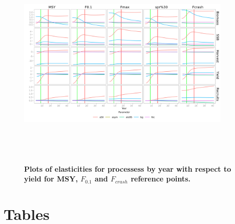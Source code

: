 \documentclass[10pt]{article}
\begin{document}
\begin{figure}[!ht]
\begin{center}
\includegraphics[height=4in, width=4in]{fig7.png}
\caption{\bf{Plots of elasticities for processess by year with respect to yield for  MSY, $F_{0.1}$ and $F_{crash}$ reference points.}}
\end{center}
\label{Figure_label_7}
\end{figure}


\section*{Tables}
\end{document}
